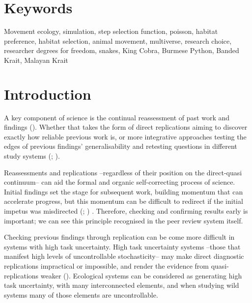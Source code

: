 \documentclass[10pt,a4paper]{article}
\begin{document}
\section*{Keywords}

Movement ecology, simulation, step selection function, poisson, habitat preference, habitat selection, animal movement, multiverse, research choice, researcher degrees for freedom, snakes, King Cobra, Burmese Python, Banded Krait, Malayan Krait

\clearpage
\pagestyle{fancy}

\section{Introduction}\label{introduction}

A key component of science is the continual reassessment of past work and findings ().
Whether that takes the form of direct replications aiming to discover exactly how reliable previous work is, or more integrative approaches testing the edges of previous findings' generalisability and retesting questions in different study systems (; ).

Reassessments and replications --regardless of their position on the direct-quasi continuum-- can aid the formal and organic self-correcting process of science.
Initial findings set the stage for subsequent work, building momentum that can accelerate progress, but this momentum can be difficult to redirect if the initial impetus was misdirected (; ) .
Therefore, checking and confirming results early is important; we can see this principle recognised in the peer review system itself.

Checking previous findings through replication can be come more difficult in systems with high task uncertainty.
High task uncertainty systems --those that manifest high levels of uncontrollable stochasticity-- may make direct diagnostic replications impractical or impossible, and render the evidence from quasi-replications weaker ().
Ecological systems can be considered as generating high task uncertainty, with many interconnected elements, and when studying wild systems many of those elements are uncontrollable.
\end{document}
